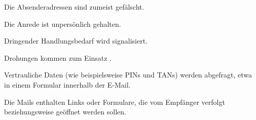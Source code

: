 \item Die Absenderadressen sind zumeist gefälscht.
\item Die Anrede ist unpersönlich gehalten.
\item Dringender Handlungsbedarf wird signalisiert.
\item Drohungen kommen zum Einsatz .
\item Vertrauliche Daten (wie beispielsweise PINs und TANs) werden abgefragt, etwa in einem Formular innerhalb der E-Mail.
\item Die Mails enthalten Links oder Formulare, die vom Empfänger verfolgt beziehungsweise geöffnet werden sollen.